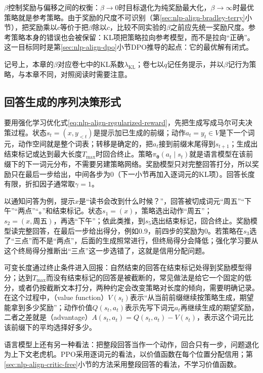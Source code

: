$\beta$控制奖励与偏移之间的权衡：$\beta\to0$时目标退化为纯奖励最大化，$\beta\to\infty$时最优策略就是参考策略。由于奖励的尺度不可识别（第\ref{sec:nlp-align-bradley-terry}小节），把奖励乘以$c$等价于把$\beta$除以$c$，比较不同实验的$\beta$之前应先统一奖励尺度。参考策略本身的错误也会被保留：KL项把策略拉向参考模型，而不是拉向“正确”。这一目标同时是第\ref{sec:nlp-align-dpo}小节DPO推导的起点：它的最优解有闭式。

记号上，本章的$\beta$对应卷七中的KL系数$\lambda_{\mathrm{KL}}$；卷七以$q$记任务提示，并以$\beta$记行为策略，与本章不同，对照阅读时需要注意。

\subsection{回答生成的序列决策形式}
\label{sec:nlp-align-mdp}

要用强化学习优化式\eqref{eq:nlp-align-regularized-reward}，先把生成写成马尔可夫决策过程。状态$s_t=(x,y_{<t})$是提示加已生成的前缀；动作$a_t=y_t\in V$是下一个词元，动作空间就是整个词表；转移是确定的，把$a_t$接到前缀末尾得到$s_{t+1}$；生成出结束标记或达到最大长度$T_{\max}$时回合终止。策略$\pi_{\bm\theta}(a_t\mid s_t)$就是语言模型在该前缀下的下一词元分布，不需要另建策略网络。奖励模型只对完整回答打分，所以奖励只在最后一步给出，中间各步为0（下一小节再加入逐词元的KL项）。回答长度有限，折扣因子通常取$\gamma=1$。

以通知问答为例，提示$x$是“读书会改到什么时候？”，回答被切成词元“周五”“下午”“两点”“。”和结束标记。状态$s_1=(x)$，策略选出动作“周五”；$s_2=(x,\text{周五})$，再选“下午”；依此类推，到$s_5$选出结束标记，回合终止。奖励模型读完整回答，在最后一步给出得分，例如$0.9$，前四步的奖励为0。若策略在$s_3$选了“三点”而不是“两点”，后面的生成照常进行，但终局得分会降低；强化学习要从这个终局得分推断出“三点”这一步选错了，这就是信用分配问题。

可变长度通过终止条件进入回报：自然结束的回答在结束标记处得到奖励模型得分；达到$T_{\max}$而没有结束标记的回答是被截断的，常见做法是给它一个固定的低分，或者仍按截断文本打分，两种约定会改变策略对长度的倾向，需要明确记录。在这个过程中，（value function）$V(s_t)$表示“从当前前缀继续按策略生成，期望能拿到多少奖励”；动作价值$Q(s_t,a_t)$表示先写下词元$a_t$再继续生成的期望奖励，二者之差就是（advantage）$A(s_t,a_t)=Q(s_t,a_t)-V(s_t)$，表示这个词元比该前缀下的平均选择好多少。

语言模型上还有另一种看法：把整段回答当作一个动作，回合只有一步，问题退化为上下文老虎机。PPO采用逐词元的看法，以价值函数在每个位置分配信用；第\ref{sec:nlp-align-critic-free}小节的方法采用整段回答的看法，不学习价值函数。

